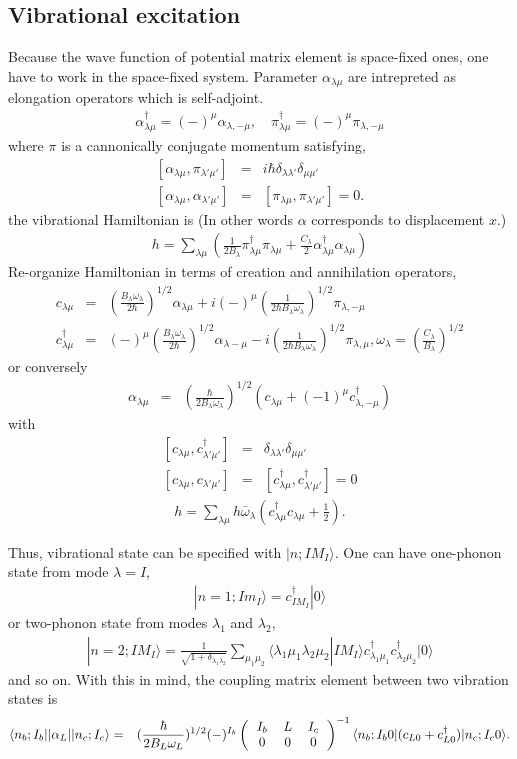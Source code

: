 \documentclass[11pt]{book}
\def\la{\langle}
\def\ra{\rangle}
\newcommand{\bea}{\begin{eqnarray}}
\newcommand{\eea}{\end{eqnarray}}
\newcommand{\no}{\nonumber \\}
\newcommand{\threejsymbol}[6]{\left(\begin{tabular}{ccc} {$#1$}&{$#2$}&{$#3$}\\
                             {$#4$}&{$#5$}&{$#6$}\end{tabular}\right)}
\begin{document}
\subsection{Vibrational excitation}
Because the wave function of potential matrix element is space-fixed ones,
one have to work in the space-fixed system. Parameter $\alpha_{\lambda\mu}$
are intrepreted as elongation operators which is self-adjoint. 
\bea 
\alpha_{\lambda\mu}^\dagger = (-)^\mu \alpha_{\lambda,-\mu},\quad 
\pi^\dagger_{\lambda\mu}=(-)^\mu \pi_{\lambda,-\mu}
\eea 
 where $\pi$ is a cannonically conjugate momentum satisfying,
\bea 
\left[ \alpha_{\lambda\mu},\pi_{\lambda'\mu'}\right] &=& i\hbar \delta_{\lambda\lambda'}\delta_{\mu\mu'}\no 
\left[\alpha_{\lambda\mu},\alpha_{\lambda'\mu'}\right]&=&\left[\pi_{\lambda\mu},\pi_{\lambda'\mu'}\right]=0.
\eea  
the vibrational Hamiltonian is (In other words $\alpha$ corresponds to displacement $x$.)
\bea 
h =\sum_{\lambda\mu}\left(\frac{1}{2B_\lambda}\pi^\dagger_{\lambda\mu}\pi_{\lambda\mu}
    +\frac{C_\lambda}{2}\alpha_{\lambda\mu}^\dagger \alpha_{\lambda\mu} \right) 
\eea   
Re-organize Hamiltonian in terms of creation and annihilation operators,
\bea 
c_{\lambda\mu}&=&(\frac{ B_\lambda\omega_\lambda}{2\hbar})^{1/2} \alpha_{\lambda\mu}
                +i(-)^\mu(\frac{1}{2\hbar B_\lambda\omega_\lambda})^{1/2} \pi_{\lambda,-\mu}  \no 
c^\dagger_{\lambda\mu}&=&(-)^\mu(\frac{ B_\lambda\omega_\lambda}{2\hbar})^{1/2} \alpha_{\lambda-\mu}
                -i(\frac{1}{2\hbar B_\lambda\omega_\lambda})^{1/2} \pi_{\lambda,\mu}, 
                \omega_\lambda = (\frac{C_\lambda}{B_\lambda})^{1/2}
\eea 
or conversely
\bea 
\alpha_{\lambda\mu}&=&(\frac{\hbar}{2B_\lambda \omega_\lambda})^{1/2}\left(c_{\lambda\mu}+(-1)^\mu c^\dagger_{\lambda,-\mu} \right) 
\eea 
with 
\bea 
\left[ c_{\lambda\mu},c^\dagger_{\lambda'\mu'}\right] &=&  \delta_{\lambda\lambda'}\delta_{\mu\mu'}\no 
\left[c_{\lambda\mu},c_{\lambda'\mu'}\right]&=&\left[c^\dagger_{\lambda\mu},c^\dagger_{\lambda'\mu'}\right]=0
\eea 
\bea 
h = \sum_{\lambda\mu} h\bar\omega_\lambda(c^\dagger_{\lambda\mu} c_{\lambda\mu}+\frac{1}{2}).
\eea 

Thus, vibrational state can be specified with $|n;I M_I\ra$. 
One can have  one-phonon state from mode $\lambda=I$,
\bea 
|n=1;I m_I\ra = c^\dagger_{I M_I}|0\ra 
\eea 
or two-phonon state from modes $\lambda_1$ and $\lambda_2$,
\bea 
|n=2; I M_I\ra =\frac{1}{\sqrt{1+\delta_{\lambda_1\lambda_2}}}
	     \sum_{\mu_1\mu_2} \la \lambda_1 \mu_1 \lambda_2 \mu_2|I M_I\ra 
	         c^\dagger_{\lambda_1\mu_1}c^\dagger_{\lambda_2\mu_2}|0\ra
\eea 
and so on. 
With this in mind, the coupling matrix element between two vibration states is
\bea 
\la n_b;I_b||\alpha_L|| n_c;I_c\ra 
&=& (\frac{\hbar}{2B_L\omega_L})^{1/2}(-)^{I_b}\threejsymbol{I_b}{L}{I_c}{0}{0}{0}^{-1}
    \la n_b; I_b 0|(c_{L0}+c_{L0}^\dagger)|n_c;I_c 0\ra. \nonumber 
\eea 
\end{document}
